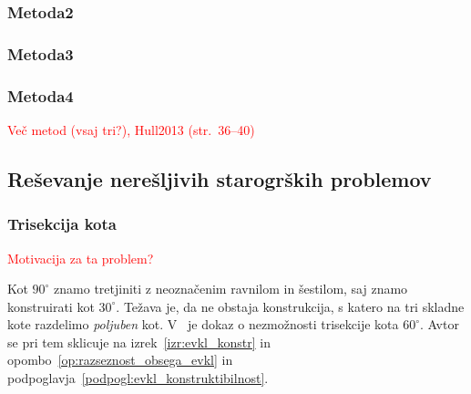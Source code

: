 \subsubsection*{Metoda2}

\subsubsection*{Metoda3}

\subsubsection*{Metoda4}

\textcolor{red}{Več metod (vsaj tri?), Hull2013 (str.\ 36--40)}



\subsection{Reševanje nerešljivih starogrških problemov}
\label{podpogl:starogrskiproblemi}




\subsubsection{Trisekcija kota}
\label{podpogl:trisekcija}

\textcolor{red}{Motivacija za ta problem?}

Kot $90^\circ$ znamo tretjiniti z neoznačenim ravnilom in šestilom, saj znamo konstruirati kot $30^\circ$. Težava je, da ne obstaja konstrukcija, s katero na tri skladne kote razdelimo \emph{poljuben} kot. V~\cite[str.\ 77--78]{jerman1998} je dokaz o nezmožnosti trisekcije kota $60^\circ$. Avtor se pri tem sklicuje na izrek~\ref{izr:evkl_konstr} in opombo~\ref{op:razseznost_obsega_evkl} in podpoglavja~\ref{podpogl:evkl_konstruktibilnost}.



